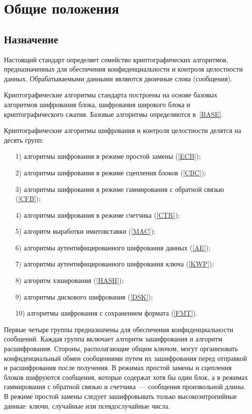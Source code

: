 \chapter{Общие положения}\label{COMMON}

\section{Назначение}

Настоящий стандарт определяет семейство криптографических алгоритмов,
предназначенных для обеспечения конфиденциальности и контроля 
целостности данных. Обрабатываемыми данными являются двоичные слова 
(сообщения). 

Криптографические алгоритмы стандарта построены на основе 
базовых алгоритмов шифрования блока, 
шифрования широкого блока и криптографического сжатия.
Базовые алгоритмы определяются в~\ref{BASE}.

Криптографические алгоритмы шифрования и контроля целостности
делятся на десять групп:
\begin{enumerate}
\item[1)]
алгоритмы шифрования в режиме простой замены (\ref{ECB});
\item[2)]
алгоритмы шифрования в режиме сцепления блоков (\ref{CBC});
\item[3)]
алгоритмы шифрования в режиме гаммирования с обратной связью (\ref{CFB});
\item[4)]
алгоритмы шифрования в режиме счетчика (\ref{CTR});
\item[5)]
алгоритм выработки имитовставки (\ref{MAC});
\item[6)]
алгоритмы аутентифицированного шифрования данных (\ref{AE});
\item[7)]
алгоритмы аутентифицированного шифрования ключа (\ref{KWP});
\item[8)]
алгоритм хэширования (\ref{HASH});
\item[9)]
алгоритмы дискового шифрования (\ref{DSK});
\item[10)]
алгоритмы шифрования с сохранением формата (\ref{FMT}).
\end{enumerate}

Первые четыре группы предназначены для обеспечения конфиденциальности сообщений. 
Каждая группа включает алгоритм зашифрования и алгоритм расшифрования.
Стороны, располагающие общим ключом, могут организовать 
конфиденциальный обмен сообщениями путем их зашифрования 
перед отправкой и расшифрования после получения.
%
В режимах простой замены и сцепления блоков шифруются сообщения,
которые содержат хотя бы один блок, 
а в режимах гаммирования с обратной связью и счетчика~--- 
сообщения произвольной длины.
%
В режиме простой замены следует зашифровывать только 
высокоэнтропийные данные: ключи, случайные или псевдослучайные числа.
%

